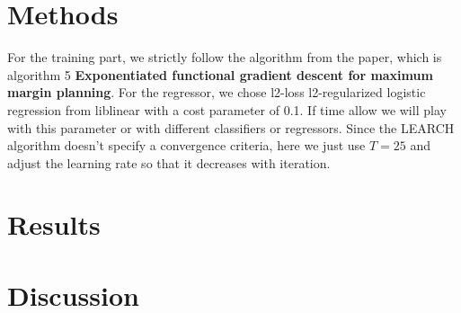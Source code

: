 \documentclass[twoside]{article}
\begin{document}
\begin{multicols}{2}
\section{Methods}
For the training part, we strictly follow the algorithm from the paper, which is algorithm 5 \textbf{Exponentiated functional gradient descent for maximum margin planning}.
For the regressor, we chose l2-loss l2-regularized logistic regression from liblinear with a cost parameter of 0.1. If time allow we will play with this parameter or with different classifiers or regressors.
Since the LEARCH algorithm doesn't specify a convergence criteria, here we just use $T=25$ and adjust the learning rate so that it decreases with iteration.


\section{Results}


\section{Discussion}


\begin{thebibliography}{2} %

%
%

\end{thebibliography}


\end{multicols}
\end{document}
